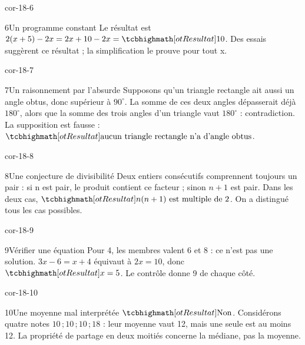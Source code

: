 \begin{blocLivre}{cor-18-6}\begin{corrige}{6}{Un programme constant}
Le résultat est $2(x+5)-2x=2x+10-2x=\res{10}$. Des essais suggèrent ce résultat ; la simplification le prouve pour tout x.
\end{corrige}\end{blocLivre}
\begin{blocLivre}{cor-18-7}\begin{corrige}{7}{Un raisonnement par l’absurde}
Supposons qu’un triangle rectangle ait aussi un angle obtus, donc supérieur à $90^\circ$. La somme de ces deux angles dépasserait déjà $180^\circ$, alors que la somme des trois angles d’un triangle vaut $180^\circ$ : contradiction. La supposition est fausse : $\res{\text{aucun triangle rectangle n’a d’angle obtus}}$.
\end{corrige}\end{blocLivre}
\begin{blocLivre}{cor-18-8}\begin{corrige}{8}{Une conjecture de divisibilité}
Deux entiers consécutifs comprennent toujours un pair : si n est pair, le produit contient ce facteur ; sinon $n+1$ est pair. Dans les deux cas, $\res{n(n+1)\text{ est multiple de 2}}$. On a distingué tous les cas possibles.
\end{corrige}\end{blocLivre}
\begin{blocLivre}{cor-18-9}\begin{corrige}{9}{Vérifier une équation}
Pour 4, les membres valent 6 et 8 : ce n’est pas une solution. $3x-6=x+4$ équivaut à $2x=10$, donc $\res{x=5}$. Le contrôle donne 9 de chaque côté.
\end{corrige}\end{blocLivre}
\begin{blocLivre}{cor-18-10}\begin{corrige}{10}{Une moyenne mal interprétée}
$\res{\text{Non}}$. Considérons quatre notes $10\,;10\,;10\,;18$ : leur moyenne vaut 12, mais une seule est au moins 12. La propriété de partage en deux moitiés concerne la médiane, pas la moyenne.
\end{corrige}\end{blocLivre}
